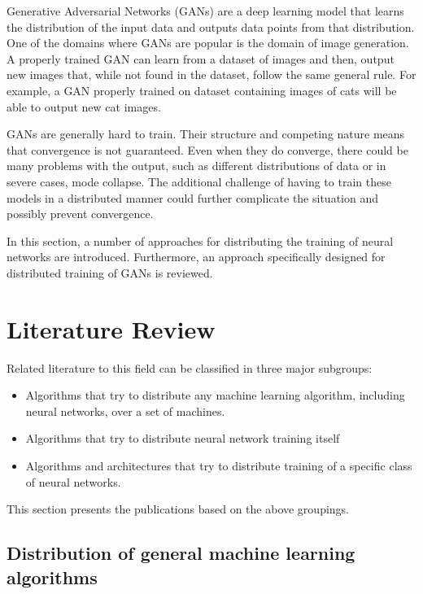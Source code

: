 \documentclass[11pt]{article}       %
\begin{document}
Generative Adversarial Networks (GANs)\cite{goodfellow2014generative} are a deep learning model that learns the distribution of the input data and outputs data points from that distribution. One of the domains where GANs are popular is the domain of image generation. A properly trained GAN can learn from a dataset of images and then, output new images that, while not found in the dataset, follow the same general rule. For example, a GAN properly trained on dataset containing images of cats will be able to output new cat images.

GANs are generally hard to train.\cite{mescheder2018training} Their structure and competing nature means that convergence is not guaranteed. Even when they do converge, there could be many problems with the output, such as different distributions of data or in severe cases, mode collapse. The additional challenge of having to train these models in a distributed manner could further complicate the situation and possibly prevent convergence.

In this section, a number of approaches for distributing the training of neural networks are introduced. Furthermore, an approach specifically designed for distributed training of GANs is reviewed.

\section{Literature Review} \label{litrev}

Related literature to this field can be classified in three major subgroups:
\begin{itemize}
\item Algorithms that try to distribute any machine learning algorithm, including neural networks, over a set of machines.
\item Algorithms that try to distribute neural network training itself
\item Algorithms and architectures that try to distribute training of a specific class of neural networks.
\end{itemize}

This section presents the publications based on the above groupings.

\subsection{Distribution of general machine learning algorithms}
\end{document}
